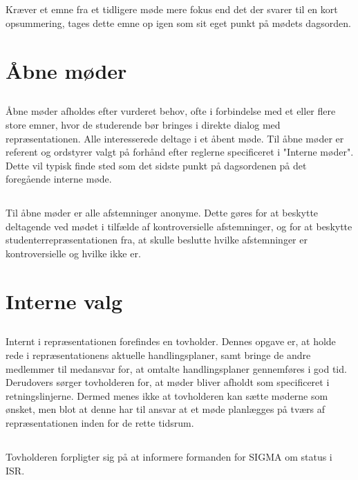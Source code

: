 \documentclass[danish,a4paper,twocolumn]{article}
\begin{document}
\subsection{}Kræver et emne fra et tidligere møde mere fokus end det der svarer til en kort opsummering, tages dette emne op igen som sit eget punkt på mødets dagsorden.
\section{Åbne møder}
 \subsection{}
Åbne møder afholdes efter vurderet behov, ofte i forbindelse med et eller 
flere store emner, hvor de studerende bør bringes i direkte dialog med repræsentationen. Alle interesserede  deltage i et åbent møde. Til åbne møder er referent og ordstyrer valgt på forhånd efter reglerne specificeret i "Interne møder". Dette vil typisk finde sted som det sidste punkt på dagsordenen på det foregående interne møde.
\subsection{}
Til åbne møder er alle afstemninger anonyme. Dette gøres for at beskytte deltagende ved mødet i tilfælde af kontroversielle afstemninger, og for at beskytte studenterrepræsentationen fra, at skulle beslutte hvilke afstemninger er kontroversielle og hvilke ikke er. %
\section{Interne valg}
\subsection{}
Internt i repræsentationen forefindes en tovholder. Dennes opgave er, at holde rede i repræsentationens aktuelle handlingsplaner, samt bringe de andre medlemmer til medansvar for, at omtalte handlingsplaner gennemføres i god tid. Derudovers sørger tovholderen for, at møder bliver afholdt som specificeret i retningslinjerne. Dermed menes ikke at tovholderen kan sætte møderne som ønsket, men blot at denne har til ansvar at et møde planlægges på tværs af repræsentationen inden for de rette tidsrum.
\subsection{}Tovholderen forpligter sig på at informere formanden for SIGMA om status i ISR.
\end{document}
